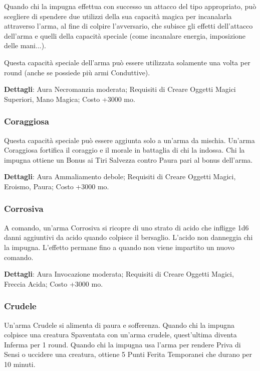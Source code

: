 \begin{multicols}{2}
Quando chi la impugna effettua con successo un attacco del tipo appropriato, può scegliere di spendere due utilizzi della sua capacità magica per incanalarla attraverso l'arma, al fine di colpire l'avversario, che subisce gli effetti dell'attacco dell'arma e quelli della capacità speciale (come incanalare energia, imposizione delle mani...).

Questa capacità speciale dell'arma può essere utilizzata solamente una volta per round (anche se possiede più armi Conduttive).

\textbf{Dettagli}: Aura Necromanzia moderata; Requisiti di Creare Oggetti Magici Superiori, Mano Magica; Costo +3000 mo.

\subsubsection*{Coraggiosa}

Questa capacità speciale può essere aggiunta solo a un'arma da mischia. Un'arma Coraggiosa fortifica il coraggio e il morale in battaglia di chi la indossa. Chi la impugna ottiene un Bonus ai Tiri Salvezza contro Paura pari al bonus dell'arma.

\textbf{Dettagli}: Aura Ammaliamento debole; Requisiti di Creare Oggetti Magici, Eroismo, Paura; Costo +3000 mo.

\subsubsection*{Corrosiva}

A comando, un'arma Corrosiva si ricopre di uno strato di acido che infligge 1d6 danni aggiuntivi da acido quando colpisce il bersaglio. L'acido non danneggia chi la impugna. L'effetto permane fino a quando non viene impartito un nuovo comando.

\textbf{Dettagli}: Aura Invocazione moderata; Requisiti di Creare Oggetti Magici, Freccia Acida; Costo +3000 mo.

\subsubsection*{Crudele}

Un'arma Crudele si alimenta di paura e sofferenza. Quando chi la impugna colpisce una creatura Spaventata con un'arma crudele, quest'ultima diventa Inferma per 1 round. Quando chi la impugna usa l'arma per rendere Priva di Sensi o uccidere una creatura, ottiene 5 Punti Ferita Temporanei che durano per 10 minuti.


\end{multicols}
